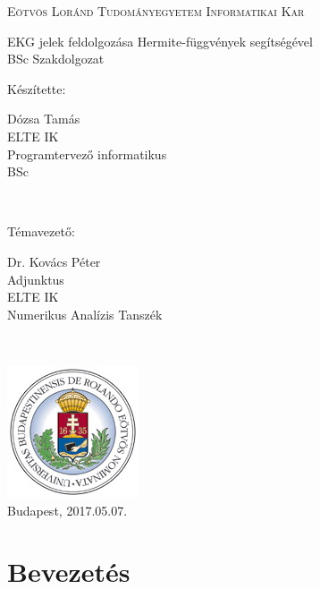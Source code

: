 \documentclass[oneside,titlepage,12pt,a4paper]{report}
\begin{document}
\begin{titlepage}
	\parbox[t]{5.5cm}{\vspace{1cm}}
\begin{center}
	\large
	\textsc{Eötvös Loránd Tudományegyetem \linebreak Informatikai Kar} \\[2cm]
\end{center}

\begin{center}
	\LARGE EKG jelek feldolgozása Hermite-függvények segítségével\\[0.55cm]
	\large BSc Szakdolgozat \\[1.9cm]
\end{center}

\begin{center}
	\parbox[t]{25mm}{Készítette:}
	\parbox[t]{5.5cm}
		{Dózsa Tamás\\
		ELTE IK\\
		Programtervező informatikus \\
		BSc
		}
	\\[0.9cm]
	
  \parbox[t]{25mm}{Témavezető:}
	\parbox[t]{5.5cm}{
		Dr. Kovács Péter\\
		Adjunktus\\
		ELTE IK\\
		Numerikus Analízis Tanszék
		}
	\\[3cm]
\end{center}

\begin{center}
	\includegraphics[scale=0.7]{./Abrak/Egyeb/elte_logo.jpg}\\[1cm]
	Budapest, 2017.05.07.
\end{center}
\end{titlepage}

\tableofcontents


\chapter{Bevezetés}
\label{intro}
\end{document}
